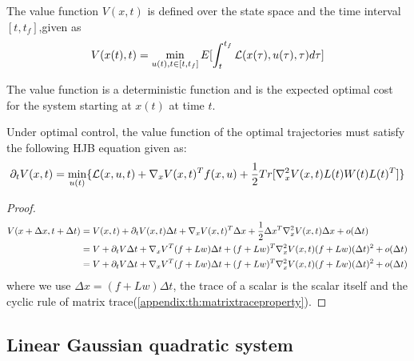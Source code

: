 \begin{refsection}
\begin{definition}
The value function $V(x,t)$ is defined over the state space and the time interval $[t,t_f]$,given as
$$V(x(t),t) = \min_{u(t),t\in [t,t_f]} E[\int_t^{t_f} \mathcal{L}(x(\tau),u(\tau),\tau) d\tau ]$$
\end{definition}

\begin{remark}[interpretation]
The value function is a deterministic function and  is the expected optimal cost for the system starting at $x(t)$ at time $t$. 
\end{remark}

\begin{theorem}\label{ch:stochastic-optimal-control:HJBequaiton}
Under optimal control, the value function of the optimal trajectories must satisfy the following HJB equation given as:
$$\partial_t V(x,t) = \min_{u(t)} \{\mathcal{L}(x,u,t) + \nabla_x V(x,t)^T f(x,u) + \frac{1}{2} Tr[\nabla_x^2 V(x,t) L(t)W(t)L(t)^T]  \}$$ 
\end{theorem}
\begin{proof}
\begin{align*}
V(x+\Delta x, t + \Delta t) &= V(x,t) + \partial_t V(x,t) \Delta t + \nabla_x V(x,t)^T \Delta x + \frac{1}{2} \Delta x^T \nabla^2_x V(x,t) \Delta x + o(\Delta t) \\
&=V + \partial_t V \Delta t + \nabla_x V^T (f + Lw)\Delta t + (f + Lw)^T\nabla^2_x V(x,t)(f + Lw)(\Delta t)^2 + o(\Delta t) \\
&=V + \partial_t V \Delta t + \nabla_x V^T (f + Lw)\Delta t + (f + Lw)^T\nabla^2_x V(x,t)(f + Lw)(\Delta t)^2 + o(\Delta t)
\end{align*}
where we use $\Delta x = (f + Lw)\Delta t $, the trace of a scalar is the scalar itself and the cyclic rule of matrix trace(\autoref{appendix:th:matrixtraceproperty}).
\end{proof}



\subsection{Linear Gaussian quadratic system}


\end{refsection}
